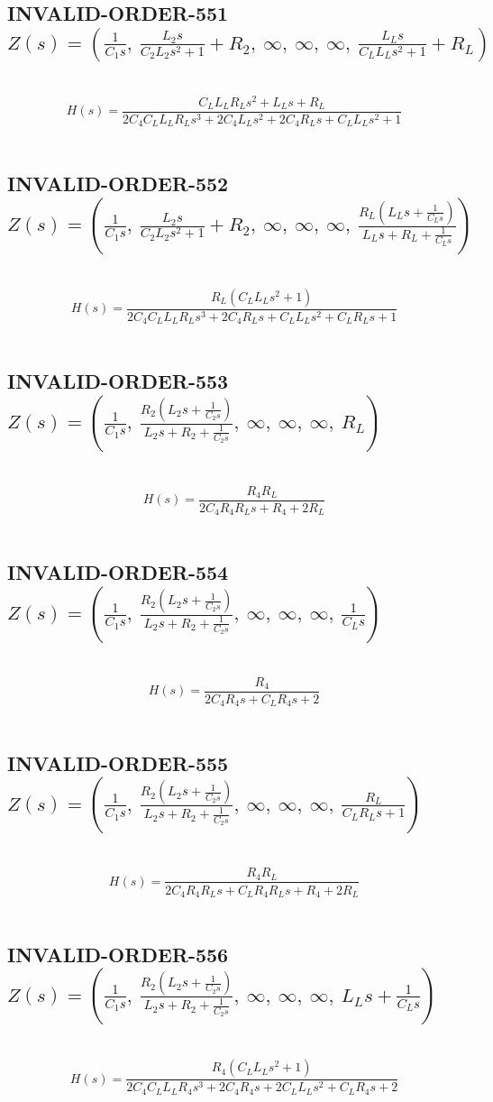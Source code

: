 \documentclass{article}
\begin{document}
\subsection{INVALID-ORDER-551 $Z(s) = \left( \frac{1}{C_{1} s}, \  \frac{L_{2} s}{C_{2} L_{2} s^{2} + 1} + R_{2}, \  \infty, \  \infty, \  \infty, \  \frac{L_{L} s}{C_{L} L_{L} s^{2} + 1} + R_{L}\right)$ } \ 
\textbf{\[H(s) = \frac{C_{L} L_{L} R_{L} s^{2} + L_{L} s + R_{L}}{2 C_{4} C_{L} L_{L} R_{L} s^{3} + 2 C_{4} L_{L} s^{2} + 2 C_{4} R_{L} s + C_{L} L_{L} s^{2} + 1}\] } \ 
\subsection{INVALID-ORDER-552 $Z(s) = \left( \frac{1}{C_{1} s}, \  \frac{L_{2} s}{C_{2} L_{2} s^{2} + 1} + R_{2}, \  \infty, \  \infty, \  \infty, \  \frac{R_{L} \left(L_{L} s + \frac{1}{C_{L} s}\right)}{L_{L} s + R_{L} + \frac{1}{C_{L} s}}\right)$ } \ 
\textbf{\[H(s) = \frac{R_{L} \left(C_{L} L_{L} s^{2} + 1\right)}{2 C_{4} C_{L} L_{L} R_{L} s^{3} + 2 C_{4} R_{L} s + C_{L} L_{L} s^{2} + C_{L} R_{L} s + 1}\] } \ 
\subsection{INVALID-ORDER-553 $Z(s) = \left( \frac{1}{C_{1} s}, \  \frac{R_{2} \left(L_{2} s + \frac{1}{C_{2} s}\right)}{L_{2} s + R_{2} + \frac{1}{C_{2} s}}, \  \infty, \  \infty, \  \infty, \  R_{L}\right)$ } \ 
\textbf{\[H(s) = \frac{R_{4} R_{L}}{2 C_{4} R_{4} R_{L} s + R_{4} + 2 R_{L}}\] } \ 
\subsection{INVALID-ORDER-554 $Z(s) = \left( \frac{1}{C_{1} s}, \  \frac{R_{2} \left(L_{2} s + \frac{1}{C_{2} s}\right)}{L_{2} s + R_{2} + \frac{1}{C_{2} s}}, \  \infty, \  \infty, \  \infty, \  \frac{1}{C_{L} s}\right)$ } \ 
\textbf{\[H(s) = \frac{R_{4}}{2 C_{4} R_{4} s + C_{L} R_{4} s + 2}\] } \ 
\subsection{INVALID-ORDER-555 $Z(s) = \left( \frac{1}{C_{1} s}, \  \frac{R_{2} \left(L_{2} s + \frac{1}{C_{2} s}\right)}{L_{2} s + R_{2} + \frac{1}{C_{2} s}}, \  \infty, \  \infty, \  \infty, \  \frac{R_{L}}{C_{L} R_{L} s + 1}\right)$ } \ 
\textbf{\[H(s) = \frac{R_{4} R_{L}}{2 C_{4} R_{4} R_{L} s + C_{L} R_{4} R_{L} s + R_{4} + 2 R_{L}}\] } \ 
\subsection{INVALID-ORDER-556 $Z(s) = \left( \frac{1}{C_{1} s}, \  \frac{R_{2} \left(L_{2} s + \frac{1}{C_{2} s}\right)}{L_{2} s + R_{2} + \frac{1}{C_{2} s}}, \  \infty, \  \infty, \  \infty, \  L_{L} s + \frac{1}{C_{L} s}\right)$ } \ 
\textbf{\[H(s) = \frac{R_{4} \left(C_{L} L_{L} s^{2} + 1\right)}{2 C_{4} C_{L} L_{L} R_{4} s^{3} + 2 C_{4} R_{4} s + 2 C_{L} L_{L} s^{2} + C_{L} R_{4} s + 2}\] } \ 
\end{document}
